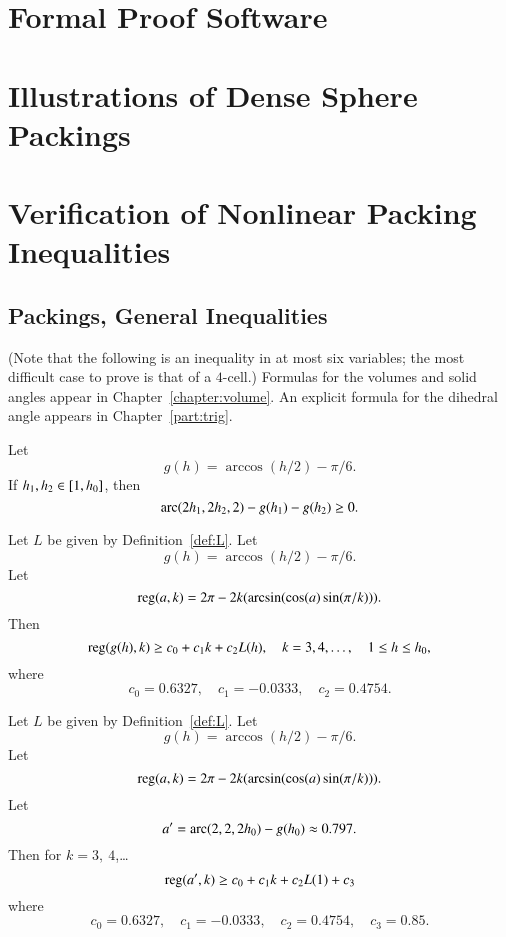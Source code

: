\chapter{Formal Proof Software}

\chapter{Illustrations of Dense Sphere Packings}

\chapter{Verification of Nonlinear Packing Inequalities}


\section{Packings, General Inequalities}


(Note that the following is an inequality in at most six variables; the most
difficult case to prove is that of a $4$-cell.)  Formulas for the
volumes and solid angles appear in Chapter~\ref{chapter:volume}.  An
explicit formula for the dihedral angle appears in
Chapter~\ref{part:trig}.




\begin{calculation}\label{calc:cc:disks}\cutrate{} 
Let
\[ 
g(h) = \arccos(h/2) - \pi/6.
\] 
If $h_1,h_2\in [1,{h_0}]$, then
\[ 
{\operatorname{arc}}(2h_1,2h_2,2) - g(h_1) - g(h_2)\ge 0.
\] 
\end{calculation}

\begin{calculation}\label{calc:cc:alin}\cutrate{}
Let $L$ be given by Definition~\ref{def:L}.
Let
\[ 
g(h) = \arccos(h/2) - \pi/6.
\] 
Let
\[ 
{\operatorname{reg}}(a,k) = 2\pi - 2 k (\arcsin(\cos(a)\sin(\pi/k))).
\] 
Then
\[ 
{\operatorname{reg}}(g(h),k) \ge c_0 + c_1 k + c_2 L(h),\quad
k = 3,4,\ldots,\quad 1\le h\le {h_0},
\] 
where
\[ c_0 = 0.6327,\quad c_1 = -0.0333,\quad c_2 =
0.4754.\] 
\end{calculation}

\begin{calculation}\label{calc:cc:alin2}\cutrate{}
Let $L$ be given by Definition~\ref{def:L}.
Let
\[ 
g(h) = \arccos(h/2) - \pi/6.
\] 
Let
\[ 
{\operatorname{reg}}(a,k) = 2\pi - 2 k (\arcsin(\cos(a)\sin(\pi/k))).
\] 
Let
\[ a'=\operatorname{arc}(2,2,2{h_0})-g({h_0}) \approx
0.797.\]  Then for $k=3,~4$,\dots
\[ {\operatorname{reg}}(a',k) \ge c_0 + c_1 k + c_2 L(1) +
c_3\] 
where 
\[ c_0 = 0.6327,\quad c_1 = -0.0333,\quad c_2 =
0.4754,\quad c_3 = 0.85.\] 
\end{calculation}




